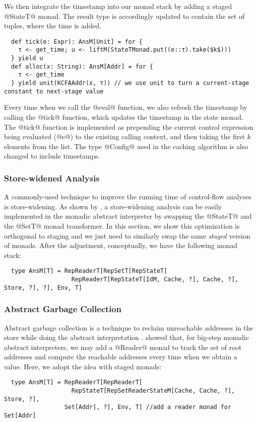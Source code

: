 We then integrate the timestamp into our monad stack by adding a staged
@StateT@ monad. The result type is accordingly updated to contain the set of
tuples, where the time is added.
\begin{lstlisting}
  def tick(e: Expr): AnsM[Unit] = for {
    τ <- get_time; u <- liftM(StateTMonad.put((e::τ).take($k$)))
  } yield u
  def alloc(x: String): AnsM[Addr] = for {
    τ <- get_time
  } yield unit(KCFAAddr(x, τ)) // we use unit to turn a current-stage constant to next-stage value
\end{lstlisting}

Every time when we call the @eval@ function, we also refresh the timestamp by
calling the @tick@ function, which updates the timestamp in the state monad.
The @tick@ function is implemented as prepending the current control expression
being evaluated (@e@) to the existing calling context, and then taking the
first $k$ elements from the list. The type @Config@ used in the caching
algorithm is also changed to include timestamps.

\subsubsection{Store-widened Analysis}

A commonly-used technique to improve the running time of control-flow analyses
is store-widening. As shown by \cite{Darais:2015:GTM:2814270.2814308,
DBLP:journals/pacmpl/DaraisLNH17}, a store-widening analysis can be easily
implemented in the monadic abstract interpreter by swapping the @StateT@ and
the @SetT@ monad transformer. In this section, we show this optimization is
orthogonal to staging and we just need to similarly swap the same
\textit{staged} version of monads. After the adjustment, conceptually, we have
the following monad stack:
\begin{lstlisting}
  type AnsM[T] = RepReaderT[RepSetT[RepStateT[
                   RepReaderT[RepStateT[IdM, Cache, ?], Cache, ?], Store, ?], ?], Env, T]
\end{lstlisting}

\subsubsection{Abstract Garbage Collection}

Abstract garbage collection is a technique to reclaim unreachable addresses in
the store while doing the abstract interpretation
\cite{Might:2006:IFA:1159803.1159807}. \citet{DBLP:journals/pacmpl/DaraisLNH17}
showed that, for big-step monadic abstract interpreters, we may add a @Reader@
monad to track the set of root addresses and compute the reachable addresses every
time when we obtain a value. Here, we adopt the idea with staged monads:
\begin{lstlisting}
  type AnsM[T] = RepReaderT[RepReaderT[
                   RepStateT[RepSetReaderStateM[Cache, Cache, ?], Store, ?],
                 Set[Addr], ?], Env, T] //add a reader monad for Set[Addr]
\end{lstlisting}

